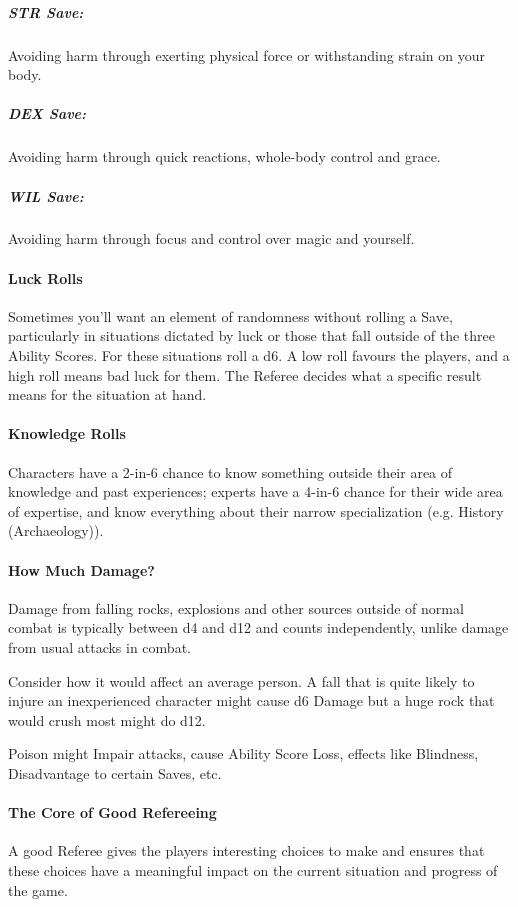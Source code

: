 \documentclass[itdr]{subfiles}
\begin{document}
\subparagraph{STR Save:} Avoiding harm through exerting physical force or withstanding strain on your body.

\subparagraph{DEX Save:} Avoiding harm through quick reactions, whole-body control and grace.

\subparagraph{WIL Save:} Avoiding harm through focus and control over magic and yourself.

\paragraph{Luck Rolls}
Sometimes you'll want an element of randomness without rolling a Save, particularly in situations dictated by luck or those that fall outside of the three Ability Scores. For these situations roll a d6. A low roll favours the players, and a high roll means bad luck for them. The Referee decides what a specific result means for the situation at hand.

\paragraph{Knowledge Rolls}
Characters have a 2-in-6 chance to know something outside their area of knowledge and past experiences; experts have a 4-in-6 chance for their wide area of expertise, and know everything about their narrow specialization (e.g. History (Archaeology)).

\paragraph{How Much Damage?}
Damage from falling rocks, explosions and other sources outside of normal combat is typically between d4 and d12 and counts independently, unlike damage from usual attacks in combat.

Consider how it would affect an average person. A fall that is quite likely to injure an inexperienced character might cause d6 Damage but a huge rock that would crush most might do d12.

Poison might Impair attacks, cause Ability Score Loss, effects like Blindness, Disadvantage to certain Saves, etc.

\paragraph{The Core of Good Refereeing}
A good Referee gives the players interesting choices to make and ensures that these choices have a meaningful impact on the current situation and progress of the game.
\end{document}
